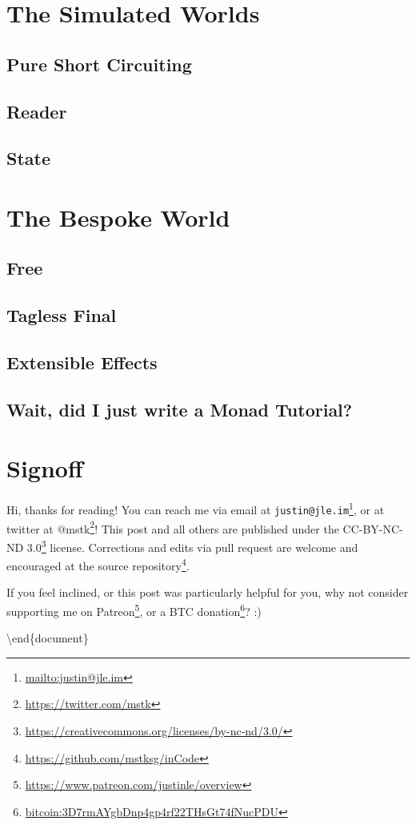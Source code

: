 \documentclass[]{article}
\renewcommand{\href}[2]{#2\footnote{\url{#1}}}
\begin{document}
\section{The Simulated Worlds}\label{the-simulated-worlds}

\subsection{Pure Short Circuiting}\label{pure-short-circuiting}

\subsection{Reader}\label{reader}

\subsection{State}\label{state}

\section{The Bespoke World}\label{the-bespoke-world}

\subsection{Free}\label{free}

\subsection{Tagless Final}\label{tagless-final}

\subsection{Extensible Effects}\label{extensible-effects}

\subsection{Wait, did I just write a Monad
Tutorial?}\label{wait-did-i-just-write-a-monad-tutorial}

\section{Signoff}\label{signoff}

Hi, thanks for reading! You can reach me via email at
\href{mailto:justin@jle.im}{\nolinkurl{justin@jle.im}}, or at twitter at
\href{https://twitter.com/mstk}{@mstk}! This post and all others are published
under the \href{https://creativecommons.org/licenses/by-nc-nd/3.0/}{CC-BY-NC-ND
3.0} license. Corrections and edits via pull request are welcome and encouraged
at \href{https://github.com/mstksg/inCode}{the source repository}.

If you feel inclined, or this post was particularly helpful for you, why not
consider \href{https://www.patreon.com/justinle/overview}{supporting me on
Patreon}, or a \href{bitcoin:3D7rmAYgbDnp4gp4rf22THsGt74fNucPDU}{BTC donation}?
:)

\textbackslash end\{document\}
\end{document}
